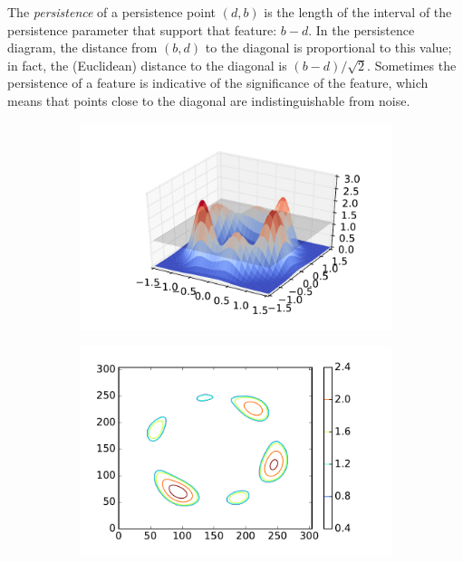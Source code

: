 \documentclass[12pt]{article}
\begin{document}
The \emph{persistence} of a persistence point $(d,b)$ is the length of the interval of the persistence parameter that support that feature: $b-d$.  In the persistence diagram, the distance from $(b,d)$ to the diagonal is proportional to this value; in fact, the (Euclidean) distance to the diagonal is $(b-d)/\sqrt{2}$. Sometimes the persistence of a feature is indicative of the
significance of the feature, which means that points close to the diagonal are indistinguishable from noise.

\begin{figure}
  \begin{subfigure}{.27\linewidth}
    \centering
    \caption{}  
        \includegraphics[width=\linewidth]{tmp2.pdf}
    \label{fig:example_3d}
  \end{subfigure}
    \begin{subfigure}{.25\linewidth}
    \centering
    \caption{}  
        \includegraphics[width=\linewidth]{tmp4.pdf}

\end{subfigure}
\end{figure}
\end{document}
